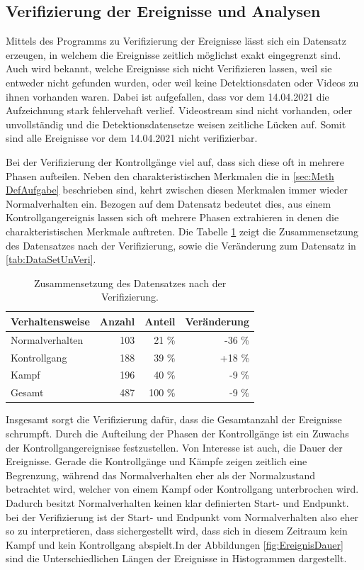\subsection{Verifizierung der Ereignisse und Analysen}
Mittels des Programms zu Verifizierung der Ereignisse lässt sich ein Datensatz erzeugen, in welchem die Ereignisse zeitlich möglichst exakt eingegrenzt sind. Auch wird bekannt, welche Ereignisse sich nicht Verifizieren lassen, weil sie entweder nicht gefunden wurden, oder weil keine Detektionsdaten oder Videos zu ihnen vorhanden waren. Dabei ist aufgefallen, dass vor dem 14.04.2021 die Aufzeichnung stark fehlervehaft verlief. Videostream sind nicht vorhanden, oder unvollständig und die Detektionsdatensetze weisen zeitliche Lücken auf. Somit sind alle Ereignisse vor dem 14.04.2021 nicht verifizierbar. \par

Bei der Verifizierung der Kontrollgänge viel auf, dass sich diese oft in mehrere Phasen aufteilen. Neben den charakteristischen Merkmalen die in \autoref{sec:Meth DefAufgabe} beschrieben sind, kehrt zwischen diesen Merkmalen immer wieder Normalverhalten ein. Bezogen auf dem Datensatz bedeutet dies, aus einem Kontrollgangereignis lassen sich oft mehrere Phasen extrahieren in denen die  charakteristischen Merkmale auftreten. Die Tabelle \ref{tab:DataSetVeri} zeigt die Zusammensetzung des Datensatzes nach der Verifizierung, sowie die Veränderung zum Datensatz in \autoref{tab:DataSetUnVeri}. 

\begin{table}[ht]
    \centering
    \caption{Zusammensetzung des Datensatzes nach der Verifizierung.}
    \begin{tabular}{|l|r|r|r|}
    \hline
        Verhaltensweise & Anzahl & Anteil & Veränderung\\
    \hline
        Normalverhalten & 103 & 21 \% & -36 \%\\
        Kontrollgang & 188 & 39 \% & +18 \%\\
        Kampf & 196 & 40 \% & -9 \%\\
    \hline
    \hline
        Gesamt & 487 & 100 \% & -9 \% \\
    \hline
    \end{tabular}
    \label{tab:DataSetVeri}
\end{table}

Insgesamt sorgt die Verifizierung dafür, dass die Gesamtanzahl der Ereignisse schrumpft. Durch die Aufteilung der Phasen der Kontrollgänge ist ein Zuwachs der Kontrollgangereignisse festzustellen. Von Interesse ist auch, die Dauer der Ereignisse. Gerade die Kontrollgänge und Kämpfe zeigen zeitlich eine Begrenzung, während das Normalverhalten eher als der Normalzustand betrachtet wird, welcher von einem Kampf oder Kontrollgang unterbrochen wird. Dadurch besitzt Normalverhalten keinen klar definierten Start- und Endpunkt. bei der Verifizierung ist der Start- und Endpunkt vom Normalverhalten also eher so zu interpretieren, dass sichergestellt wird, dass sich in diesem Zeitraum kein Kampf und kein Kontrollgang abspielt.In der Abbildungen \ref{fig:EreignisDauer} sind die Unterschiedlichen Längen der Ereignisse in Histogrammen dargestellt.

